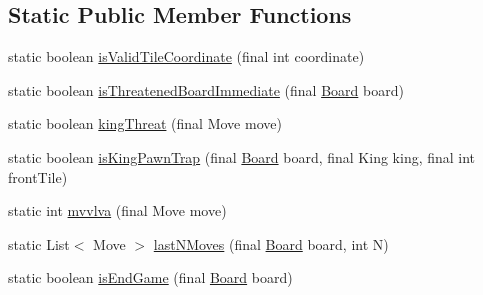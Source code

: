 \subsection*{Static Public Member Functions}
\begin{DoxyCompactItemize}
\item 
static boolean \mbox{\hyperlink{enumcom_1_1chess_1_1engine_1_1classic_1_1board_1_1_board_utils_ab808c5f614eba8ab2dfbfc114ae0f01a}{is\+Valid\+Tile\+Coordinate}} (final int coordinate)
\item 
static boolean \mbox{\hyperlink{enumcom_1_1chess_1_1engine_1_1classic_1_1board_1_1_board_utils_a229c8f734411d22e6797d35938106dd6}{is\+Threatened\+Board\+Immediate}} (final \mbox{\hyperlink{classcom_1_1chess_1_1engine_1_1classic_1_1board_1_1_board}{Board}} board)
\item 
static boolean \mbox{\hyperlink{enumcom_1_1chess_1_1engine_1_1classic_1_1board_1_1_board_utils_a0f8cd610254cc5baf8bb61e7d4db12a2}{king\+Threat}} (final Move move)
\item 
static boolean \mbox{\hyperlink{enumcom_1_1chess_1_1engine_1_1classic_1_1board_1_1_board_utils_a686295630220d770b9449d665fe51880}{is\+King\+Pawn\+Trap}} (final \mbox{\hyperlink{classcom_1_1chess_1_1engine_1_1classic_1_1board_1_1_board}{Board}} board, final King king, final int front\+Tile)
\item 
static int \mbox{\hyperlink{enumcom_1_1chess_1_1engine_1_1classic_1_1board_1_1_board_utils_a59daccec51f4479f40c7e5da7d6b8dd8}{mvvlva}} (final Move move)
\item 
static List$<$ Move $>$ \mbox{\hyperlink{enumcom_1_1chess_1_1engine_1_1classic_1_1board_1_1_board_utils_adb05e2966404897b74e348333317a68c}{last\+N\+Moves}} (final \mbox{\hyperlink{classcom_1_1chess_1_1engine_1_1classic_1_1board_1_1_board}{Board}} board, int N)
\item 
static boolean \mbox{\hyperlink{enumcom_1_1chess_1_1engine_1_1classic_1_1board_1_1_board_utils_a04ec20b157019ef594fe5e1ccf3cc640}{is\+End\+Game}} (final \mbox{\hyperlink{classcom_1_1chess_1_1engine_1_1classic_1_1board_1_1_board}{Board}} board)
\end{DoxyCompactItemize}
